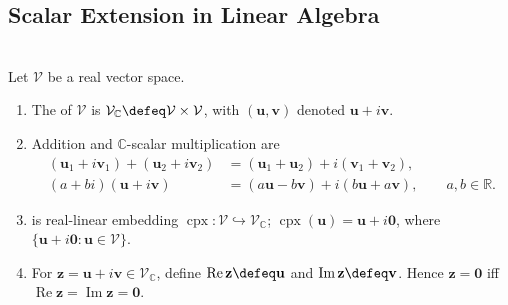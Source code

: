 \subsection{Scalar Extension in Linear Algebra}

\begin{definition} \label{def:complexification-real-vector-space} \label{def:complexification-real-imaginary-parts} \\
Let $\mathcal{V}$ be a real vector space.
\begin{enumerate}[label=(\roman*)]
\setlength{\itemsep}{0pt}
\item The  of $\mathcal{V}$ is $\mathcal{V}_{\mathbb{C}}\defeq\mathcal{V}\times\mathcal{V}$, with $(\mathbf{u},\mathbf{v})$ denoted $\mathbf{u}+i\mathbf{v}$.
\item Addition and $\mathbb{C}$-scalar multiplication are
\begin{align}
(\mathbf{u}_1+i\mathbf{v}_1)+(\mathbf{u}_2+i\mathbf{v}_2)
&=(\mathbf{u}_1+\mathbf{u}_2)+i(\mathbf{v}_1+\mathbf{v}_2), \nonumber\\
(a+bi)(\mathbf{u}+i\mathbf{v})
&=(a\mathbf{u}-b\mathbf{v})+i(b\mathbf{u}+a\mathbf{v}),
\qquad a,b\in\mathbb{R}. \nonumber
\end{align}
\item {} is real-linear embedding $\operatorname{cpx}:\mathcal{V}\hookrightarrow\mathcal{V}_{\mathbb{C}}$; $\operatorname{cpx}(\mathbf{u})=\mathbf{u}+i\mathbf{0}$, where $\{\mathbf{u}+i\mathbf{0}:\mathbf{u}\in\mathcal{V}\}$.
\item For $\mathbf{z}=\mathbf{u}+i\mathbf{v}\in\mathcal{V}_{\mathbb{C}}$, define $\operatorname{Re}\mathbf{z}\defeq\mathbf{u}$ and $\operatorname{Im}\mathbf{z}\defeq\mathbf{v}$. Hence $\mathbf{z}=\mathbf{0}$ iff $\operatorname{Re}\mathbf{z}=\operatorname{Im}\mathbf{z}=\mathbf{0}$.
\end{enumerate}
\end{definition}

